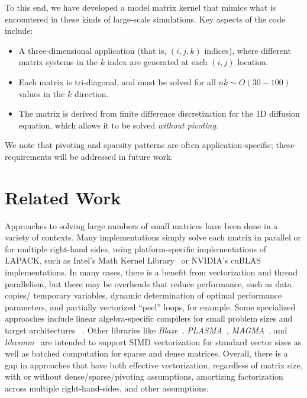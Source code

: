 \documentclass[conference]{IEEEtran}
\begin{document}
To this end, we have developed a model matrix kernel that mimics what
  is encountered in these kinds of large-scale simulations.
Key aspects of the code include:
\begin{itemize}
\item A three-dimensional application (that is, $(i,j,k)$ indices),
  where different matrix systems in the $k$ index are
  generated at each $(i,j)$ location. 
\item Each matrix is tri-diagonal, and must be solved for all 
  $nk \sim O(30-100)$ values in the $k$ direction.
\item The matrix is derived from finite difference discretization for the
  1D diffusion equation, which allows it to be solved \emph{without pivoting}.
\end{itemize}
We note that pivoting and sparsity patterns are often application-specific;
  these requirements will be addressed in future work.

\section{Related Work}
Approaches to solving large numbers of small matrices have been done
  in a variety of contexts.
Many implementations simply solve each matrix in parallel or for multiple
  right-hand sides, using platform-specific
  implementations of LAPACK, such as Intel's Math Kernel Library~\cite{mkl_website}
  or NVIDIA's cuBLAS~\cite{cublas_website} implementations.
In many cases, there is a benefit from vectorization and thread parallelism, 
  but there may be overheads that reduce performance, such as data copies/
  temporary variables, 
  dynamic determination of optimal performance parameters, 
  and partially vectorized ``peel'' loops, for example.
Some specialized approaches include linear algebra-specific 
  compilers for small problem sizes and target architectures 
 ~\cite{Spampinato:2014, NelsonEtAl_2015}.
Other libraries like 
  \emph{Blaze}~\cite{BlazeSite}, 
  \emph{PLASMA}~\cite{PLASMASite},
  \emph{MAGMA}~\cite{Haidar:2015}, and 
  \emph{libxsmm}~\cite{libxsmm_website}
  are intended to support SIMD vectorization for standard vector sizes
  as well as batched computation for sparse and dense matrices.
Overall, there is a gap in approaches that have both effective vectorization,
  regardless of matrix size, with or without dense/sparse/pivoting 
  assumptions, amortizing factorization across multiple right-hand-sides, 
  and other assumptions.
\end{document}
